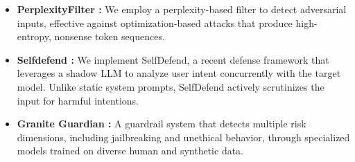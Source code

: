 \documentclass[11pt]{article}
\begin{document}
\begin{itemize}[leftmargin=*,nosep]
    \item \textbf{PerplexityFilter \cite{alon2023detecting}:} We employ a perplexity-based filter to detect adversarial inputs, effective against optimization-based attacks that produce high-entropy, nonsense token sequences.%
    
    \item \textbf{Selfdefend \cite{wang2025selfdefend}:} We implement SelfDefend, a recent defense framework that leverages a shadow LLM to analyze user intent concurrently with the target model. Unlike static system prompts, SelfDefend actively scrutinizes the input for harmful intentions.%

    \item \textbf{Granite Guardian \cite{padhi-etal-2025-granite}:} A guardrail system that detects multiple risk dimensions, including jailbreaking and unethical behavior, through specialized models trained on diverse human and synthetic data. 

    
\end{itemize}
\end{document}
